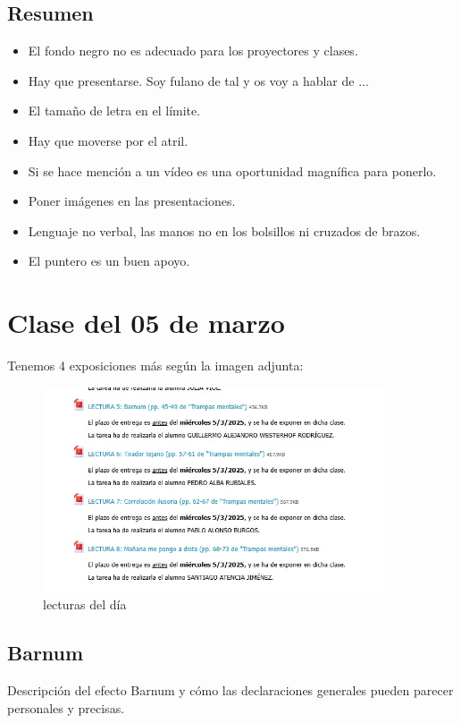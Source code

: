 \documentclass[12pt, a4paper, twoside]{article}
\begin{document}
\subsection{Resumen}
\begin{itemize}
    \item El fondo negro no es adecuado para los proyectores y clases.
    \item Hay que presentarse. Soy fulano de tal y os voy a hablar de ...
    \item El tamaño de letra en el límite.
    \item Hay que moverse por el atril.
    \item Si se hace mención a un vídeo es una oportunidad magnífica para ponerlo.
    \item Poner imágenes en las presentaciones.
    \item Lenguaje no verbal, las manos no en los bolsillos ni cruzados de brazos.
    \item El puntero es un buen apoyo.
    
\end{itemize}

\newpage

\section{Clase del 05 de marzo}

Tenemos 4 exposiciones más según la imagen adjunta:
\begin{figure}[h]
    \centering
    \includegraphics[width=0.9\textwidth]{./Images/0305.jpg}
    \caption{lecturas del día}
\end{figure}

\subsection{Barnum}
Descripción del efecto Barnum y cómo las declaraciones generales pueden parecer personales y precisas.
\end{document}
